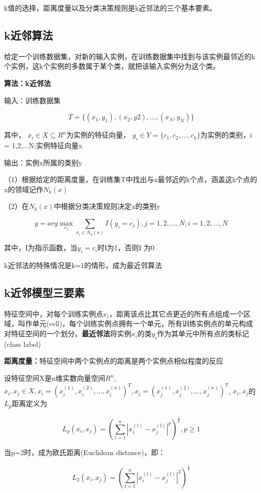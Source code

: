 \documentclass{ctexart}
\begin{document}
	k值的选择，距离度量以及分类决策规则是k近邻法的三个基本要素。
	
	\subsection{k近邻算法}
	
	给定一个训练数据集，对新的输入实例，在训练数据集中找到与该实例最邻近的k个实例，这k个实例的多数属于某个类，就把该输入实例分为这个类。
	
	\textbf{算法：k近邻法}
	
	输入：训练数据集
	
	\[T = \{(x_1, y_1),(x_2, y2),...,(x_N, y_N)\}\]
	
	其中， \(x_i \in X \subseteq R^n\)为实例的特征向量， \(y_i \in Y = \{c_1, c_2,...,c_k\}\)为实例的类别，i = 1,2,...N;实例特征向量x
	
	输出：实例x所属的类别y
	
	（1）根据给定的距离度量，在训练集T中找出与x最邻近的k个点，涵盖这k个点的x的领域记作\(N_k(x)\)
	
	（2）在\(N_k(x)\)中根据分类决策规则决定x的类别y
	
	\[y = arg \max\limits_{c_j} \sum_{x_i \in N_k(x)}I(y_i = c_j), j = 1,2,...,N; i = 1,2,...,N\]	
	
	其中，I为指示函数，当\(y_i = c_i\)时I为1，否则I 为0
	
	k近邻法的特殊情况是k=1的情形，成为最近邻算法
	
	\subsection{k近邻模型三要素}
	
	特征空间中，对每个训练实例点\(x_i\)，距离该点比其它点更近的所有点组成一个区域，叫作单元(cell)，每个训练实例点拥有一个单元，所有训练实例点的单元构成对特征空间的一个划分。\textbf{最近邻法}将实例\(x_i\)的类\(y_i\)作为其单元中所有点的类标记(class label)
	
	\textbf{距离度量：}特征空间中两个实例点的距离是两个实例点相似程度的反应
	
	设特征空间X是n维实数向量空间\(R^n\), \(x_i, x_j \in X, x_i = (x_i^{(1)}, x_i^{(2)}, ..., x_i^{(n)})^T, x_j = (x_j^{(1)}, x_j^{(2)}, ..., x_j^{(n)})^T\), \(x_i, x_j\)的\(L_p\)距离定义为
	
	\[L_p(x_i, x_j) = (\sum_{l=1}^{n} |x_i^{(l)} - x_j^{(l)}|^p)^{\frac{1}{p}}, p \geq 1\]
	
	当p=2时，成为欧氏距离(Euclidean distance)，即：
	
	\[L_2(x_i, x_j) = (\sum_{l=1}^{n} |x_i^{(l)} - x_j^{(l)}|^2)^{\frac{1}{2}}\]
	
\end{document}

